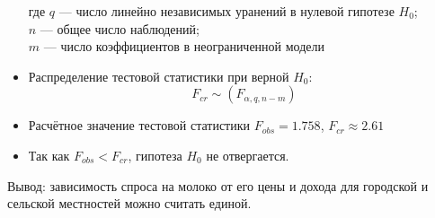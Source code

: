 \begin{problem}
\begin{sol}
\begin{itemize}
\[\]
где $q$ — число линейно независимых уранений в нулевой гипотезе $H_0$;\\
$n$ — общее число наблюдений;\\
$m$ — число коэффициентов в неограниченной модели
\item Распределение тестовой статистики при верной $H_0$:
\[
F_{cr}\sim(F_{\alpha,q,n-m})
\]
\item Расчётное значение тестовой статистики $F_{obs}=1.758$, $F_{cr}\approx 2.61$
\item Так как $F_{obs}<F_{cr}$, гипотеза $H_0$ не отвергается.
\end{itemize}
Вывод: зависимость спроса на молоко от его цены и дохода для городской и сельской местностей можно считать единой.
\end{sol}
\end{problem}



